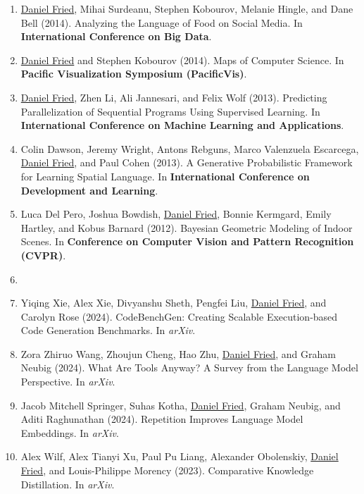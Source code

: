 \begin{enumerate}[leftmargin=-1mm,partopsep=0pt]
\item \underline{Daniel Fried}, Mihai Surdeanu, Stephen Kobourov, Melanie Hingle, and Dane Bell (2014). Analyzing the Language of Food on Social Media. In \textbf{International Conference on Big Data}.

\item \underline{Daniel Fried} and Stephen Kobourov (2014). Maps of Computer Science. In \textbf{Pacific Visualization Symposium (PacificVis)}.

\item \underline{Daniel Fried}, Zhen Li, Ali Jannesari, and Felix Wolf (2013). Predicting Parallelization of Sequential Programs Using Supervised Learning. In \textbf{International Conference on Machine Learning and Applications}.

\item Colin Dawson, Jeremy Wright, Antons Rebguns, Marco Valenzuela Escarcega, \underline{Daniel Fried}, and Paul Cohen (2013). A Generative Probabilistic Framework for Learning Spatial Language. In \textbf{International Conference on Development and Learning}.

\item Luca Del Pero, Joshua Bowdish, \underline{Daniel Fried}, Bonnie Kermgard, Emily Hartley, and Kobus Barnard (2012). Bayesian Geometric Modeling of Indoor Scenes. In \textbf{Conference on Computer Vision and Pattern Recognition (CVPR)}.

\item[]

\item Yiqing Xie, Alex Xie, Divyanshu Sheth, Pengfei Liu, \underline{Daniel Fried}, and Carolyn Rose (2024). {CodeBenchGen}: Creating Scalable Execution-based Code Generation Benchmarks. In \emph{arXiv}.

\item Zora Zhiruo Wang, Zhoujun Cheng, Hao Zhu, \underline{Daniel Fried}, and Graham Neubig (2024). What Are Tools Anyway? A Survey from the Language Model Perspective. In \emph{arXiv}.

\item Jacob Mitchell Springer, Suhas Kotha, \underline{Daniel Fried}, Graham Neubig, and Aditi Raghunathan (2024). Repetition Improves Language Model Embeddings. In \emph{arXiv}.

\item Alex Wilf, Alex Tianyi Xu, Paul Pu Liang, Alexander Obolenskiy, \underline{Daniel Fried}, and Louis-Philippe Morency (2023). Comparative Knowledge Distillation. In \emph{arXiv}.


\end{enumerate}
